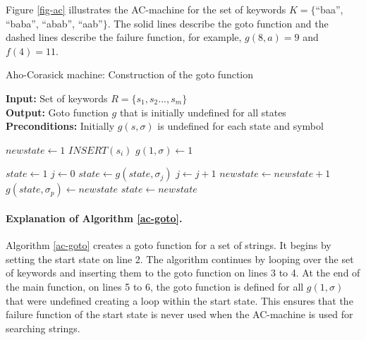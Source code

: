 \documentclass[english,twoside,censored,csm,algorithms-track-2020]{HYthesisML}
\theoremstyle{plain}
\theoremstyle{definition}
\begin{document}
Figure \ref{fig-ac} illustrates the AC-machine for the set of
keywords $K=\{$``baa'', ``baba'', ``abab'', ``aab''$\}$. The solid lines describe the goto function
and the dashed lines describe the failure function, for example, $g(8, a) = 9$ and $f(4)=11$.

\begin{algorithm}[t]
  
  \caption{Aho-Corasick machine: Construction of the goto function} \label{ac-goto}
  \hspace*{\algorithmicindent} \textbf{Input:} Set of keywords $R = \{s_1,s_2...,s_m\}$\\
  \hspace*{\algorithmicindent} \textbf{Output:} Goto function $g$ that is initially undefined for all states\\
  \hspace*{\algorithmicindent} \textbf{Preconditions:} Initially $g(s,\sigma)$ is undefined for each state and symbol
  
      \begin{algorithmic}[1]

          \State $newstate\gets 1$
            \State $INSERT(s_i)$
          \EndFor
            \State $g(1,\sigma)\gets 1$
          \EndFor
        \EndFunction

      \item[]

          \State $state\gets 1$
          \State $j\gets 0$
            \State $state\gets g(state,\sigma_j)$
            \State $j\gets j+1$
          \EndWhile
            \State $newstate\gets newstate+1$
            \State $g(state,\sigma_p)\gets newstate$
            \State $state\gets newstate$
          \EndFor
        \EndFunction
      \end{algorithmic}
      
  \end{algorithm}

  \paragraph{Explanation of Algorithm \ref{ac-goto}.}
  Algorithm \ref{ac-goto} creates a goto function for a set of strings. It begins by setting the start state on line 2.
  The algorithm continues by looping over the set of keywords and inserting them to the
  goto function on lines 3 to 4. At the end of the main function, on lines 5 to 6,
  the goto function is defined for all $g(1,\sigma)$ that were undefined creating a loop within
  the start state. This ensures that the failure function of the start state is never used when the
  AC-machine is used for searching strings.
\end{document}
